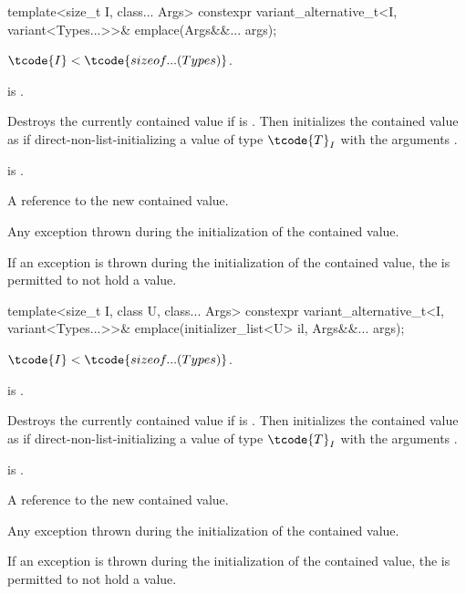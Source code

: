 %
\begin{itemdecl}
template<size_t I, class... Args>
  constexpr variant_alternative_t<I, variant<Types...>>& emplace(Args&&... args);
\end{itemdecl}

\begin{itemdescr}  %
\pnum
\mandates
$\tcode{I} < \tcode{sizeof...(Types)}$.

\pnum
\constraints
{} is .

\pnum
\effects
Destroys the currently contained value if 
is .
Then initializes the contained value as if direct-non-list-initializing
a value of type $\tcode{T}_I$
with the arguments .

\pnum
\ensures
{} is .

\pnum
\returns
A reference to the new contained value.

\pnum
\throws
Any exception thrown during the initialization of the contained value.

\pnum
\remarks
If an exception is thrown during the initialization of the contained value,
the  is permitted to not hold a value.
\end{itemdescr}

%
\begin{itemdecl}
template<size_t I, class U, class... Args>
  constexpr variant_alternative_t<I, variant<Types...>>&
    emplace(initializer_list<U> il, Args&&... args);
\end{itemdecl}

\begin{itemdescr}  %
\pnum
\mandates
$\tcode{I} < \tcode{sizeof...(Types)}$.

\pnum
\constraints
{} is .

\pnum
\effects
Destroys the currently contained value if 
is .
Then initializes the contained value as if direct-non-list-initializing
a value of type $\tcode{T}_I$
with the arguments .

\pnum
\ensures
{} is .

\pnum
\returns
A reference to the new contained value.

\pnum
\throws
Any exception thrown during the initialization of the contained value.

\pnum
\remarks
If an exception is thrown during the initialization of the contained value,
the  is permitted to not hold a value.
\end{itemdescr}

